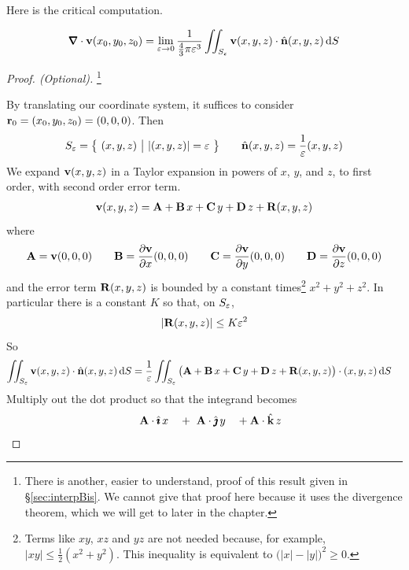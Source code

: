 Here is the critical computation.
\begin{lemma}\label{lem:divInterp}
\begin{align*}
\vnabla\cdot\vv(x_0,y_0,z_0)
=\lim_{\veps\rightarrow 0}
     \frac{1}{\frac{4}{3}\pi\veps^3}
           \dblInt_{S_\veps}\vv(x,y,z)\cdot\hn(x,y,z)\,\dee{S}
\end{align*}
\end{lemma}


\begin{proof}[Proof. (Optional)]\footnote{There is another, easier to understand, proof of this result given in \S\ref{sec:interpBis}. We cannot give that proof here because it uses the divergence theorem, which we will get to
later in the chapter.}

By translating our coordinate system, it suffices to consider 
$\mathbf{r}_0=(x_0,y_0,z_0) = (0,0,0)$. Then
\begin{align*}
S_\varepsilon = \big\{ \ (x,y,z)\ \big|\ |(x,y,z)|=\varepsilon\ \big\}\qquad
\hat{\mathbf{n}}(x,y,z) = \frac{1}{\varepsilon}(x,y,z)
\end{align*}
We expand $\mathbf{v}(x,y,z)$ in a Taylor expansion in powers of $x$, $y$, and $z$,
to first order, with second order error term.
\begin{align*}
\mathbf{v}(x,y,z) = \mathbf{A} + \mathbf{B}\,x +\mathbf{C}\,y +\mathbf{D}\, z +\mathbf{R}(x,y,z)
\end{align*}
where
\begin{align*}
\mathbf{A}=\mathbf{v}(0,0,0) \qquad
\mathbf{B}=\frac{\partial \mathbf{v}}{\partial x}(0,0,0) \qquad
\mathbf{C}=\frac{\partial \mathbf{v}}{\partial y}(0,0,0) \qquad
\mathbf{D}=\frac{\partial \mathbf{v}}{\partial z}(0,0,0) 
\end{align*}
and the error term $\mathbf{R}(x,y,z)$ is bounded by a constant 
times\footnote{ Terms like $xy$, $xz$ and $yz$ are not needed
because, for example, $|xy|\le \frac{1}{2}(x^2+y^2)$. This inequality
is equivalent to $\big(|x|-|y|\big)^2\ge 0$.}
$x^2+y^2+z^2$. In particular there is a constant $K$ so that, on $S_\varepsilon$,
\begin{equation*}
|\mathbf{R}(x,y,z)|\le K\varepsilon^2
\end{equation*}
So 
\begin{align*}
\iint_{S_\varepsilon}\mathbf{v}(x,y,z)\cdot\hat{\mathbf{n}}(x,y,z)\,\mathrm{d}S
&= \frac{1}{\varepsilon} \iint_{S_\varepsilon}\big(
   \mathbf{A} + \mathbf{B}\,x +\mathbf{C}\,y +\mathbf{D}\, z +\mathbf{R}(x,y,z)
\big)\cdot (x,y,z)\,\mathrm{d}S
\end{align*}
Multiply out the dot product so that the integrand becomes
\begin{alignat*}{5}
&\phantom{+}\ \vA\cdot\hi\,x
&&+\ \vA\cdot\hj\,y
&&+\vA\cdot\hk\,z \\ 

\end{alignat*}
\end{proof}
